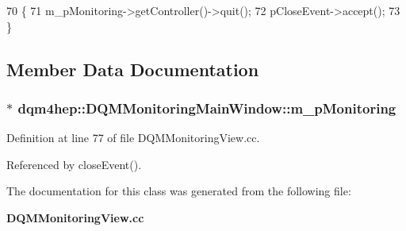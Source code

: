 \begin{DoxyCode}
70   \{
71     m_pMonitoring->getController()->quit();
72     pCloseEvent->accept();
73   \}
\end{DoxyCode}


\subsection{Member Data Documentation}
\subsubsection[{m\+\_\+p\+Monitoring}]{$\ast$ dqm4hep\+::\+D\+Q\+M\+Monitoring\+Main\+Window\+::m\+\_\+p\+Monitoring\hspace{0.3cm}{\ttfamily [private]}}\label{classdqm4hep_1_1DQMMonitoringMainWindow_a978cbf04dff7fbe59c865cbf533f09cf}


Definition at line 77 of file D\+Q\+M\+Monitoring\+View.\+cc.



Referenced by close\+Event().



The documentation for this class was generated from the following file\+:\begin{DoxyCompactItemize}
\item 
{\bf D\+Q\+M\+Monitoring\+View.\+cc}\end{DoxyCompactItemize}
